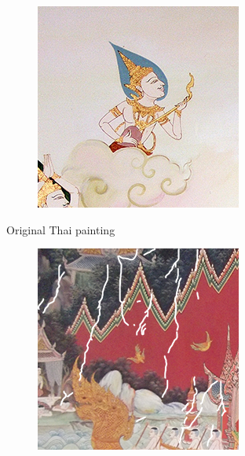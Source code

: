 \documentclass[xcolor=dvipsnames, xetex,serif]{beamer}
\begin{document}
\begin{frame}
\begin{figure}[H]
\begin{subfigure}{0.15\linewidth}
            \end{subfigure}
            \begin{subfigure}{0.15\linewidth}
                \centering
                \includegraphics[width=0.9\linewidth]{images/thaiart/case05-original.png}
            \end{subfigure}
            \caption{Original Thai painting}
        \end{figure}
        \begin{figure}[H]
            \centering
            \begin{subfigure}{0.15\linewidth}
                \centering
                \includegraphics[width=0.9\linewidth]{images/thaiart/case01-toinpaint.png}

\end{subfigure}
\end{figure}
\end{frame}
\end{document}
